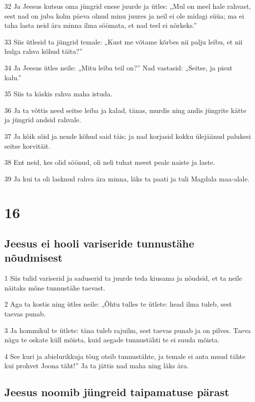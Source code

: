 \par 32 Ja Jeesus kutsus oma jüngrid enese juurde ja ütles: „Mul on meel hale rahvast, sest nad on juba kolm päeva olnud minu juures ja neil ei ole midagi süüa; ma ei taha lasta neid ära minna ilma söömata, et nad teel ei nõrkeks.”
\par 33 Siis ütlesid ta jüngrid temale: „Kust me võtame kõrbes nii palju leibu, et nii hulga rahva kõhud täita?”
\par 34 Ja Jeesus ütles neile: „Mitu leiba teil on?” Nad vastasid: „Seitse, ja pisut kalu.”
\par 35 Siis ta käskis rahva maha istuda.
\par 36 Ja ta võttis need seitse leiba ja kalad, tänas, murdis ning andis jüngrite kätte ja jüngrid andsid rahvale.
\par 37 Ja kõik sõid ja nende kõhud said täis; ja nad korjasid kokku ülejäänud palukesi seitse korvitäit.
\par 38 Ent neid, kes olid söönud, oli neli tuhat meest peale naiste ja laste.
\par 39 Ja kui ta oli lasknud rahva ära minna, läks ta paati ja tuli Magdala maa-alale.


\chapter{16}

\section*{Jeesus ei hooli variseride tunnustähe nõudmisest}

\par 1 Siis tulid variserid ja saduserid ta juurde teda kiusama ja nõudsid, et ta neile näitaks mõne tunnustähe taevast.
\par 2 Aga ta kostis ning ütles neile: „Õhtu tulles te ütlete: head ilma tuleb, sest taevas punab.
\par 3 Ja hommikul te ütlete: täna tuleb rajuilm, sest taevas punab ja on pilves. Taeva nägu te oskate küll mõista, kuid aegade tunnustähti te ei suuda mõista.
\par 4 See kuri ja abielurikkuja tõug otsib tunnustähte, ja temale ei anta muud tähte kui prohvet Joona täht!” Ja ta jättis nad maha ning läks ära.

\section*{Jeesus noomib jüngreid taipamatuse pärast}

